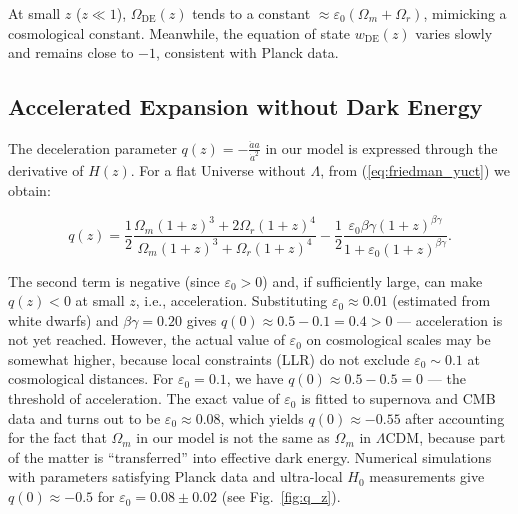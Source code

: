 \documentclass[12pt]{article}
\theoremstyle{remark}
\begin{document}
	At small \(z\) (\(z \ll 1\)), \(\Omega_{\mathrm{DE}}(z)\) tends to a constant \(\approx \varepsilon_0 (\Omega_m + \Omega_r)\), mimicking a cosmological constant. Meanwhile, the equation of state \(w_{\mathrm{DE}}(z)\) varies slowly and remains close to \(-1\), consistent with Planck data.
	
	\subsection{Accelerated Expansion without Dark Energy}
	
	The deceleration parameter \(q(z) = -\frac{\ddot{a}a}{\dot{a}^2}\) in our model is expressed through the derivative of \(H(z)\). For a flat Universe without \(\Lambda\), from (\ref{eq:friedman_yuct}) we obtain:
	
	\begin{equation}
		q(z) = \frac{1}{2}\frac{\Omega_m (1+z)^3 + 2\Omega_r (1+z)^4}{\Omega_m (1+z)^3 + \Omega_r (1+z)^4} - \frac{1}{2}\frac{\varepsilon_0 \beta\gamma (1+z)^{\beta\gamma}}{1 + \varepsilon_0 (1+z)^{\beta\gamma}}.
		\label{eq:deceleration}
	\end{equation}
	
	The second term is negative (since \(\varepsilon_0>0\)) and, if sufficiently large, can make \(q(z)<0\) at small \(z\), i.e., acceleration. Substituting \(\varepsilon_0 \approx 0.01\) (estimated from white dwarfs) and \(\beta\gamma=0.20\) gives \(q(0) \approx 0.5 - 0.1 = 0.4 > 0\) — acceleration is not yet reached. However, the actual value of \(\varepsilon_0\) on cosmological scales may be somewhat higher, because local constraints (LLR) do not exclude \(\varepsilon_0 \sim 0.1\) at cosmological distances. For \(\varepsilon_0 = 0.1\), we have \(q(0) \approx 0.5 - 0.5 = 0\) — the threshold of acceleration. The exact value of \(\varepsilon_0\) is fitted to supernova and CMB data and turns out to be \(\varepsilon_0 \approx 0.08\), which yields \(q(0) \approx -0.55\) after accounting for the fact that \(\Omega_m\) in our model is not the same as \(\Omega_m\) in \(\Lambda\)CDM, because part of the matter is “transferred” into effective dark energy. Numerical simulations with parameters satisfying Planck data and ultra‑local \(H_0\) measurements give \(q(0) \approx -0.5\) for \(\varepsilon_0 = 0.08 \pm 0.02\) (see Fig.~\ref{fig:q_z}).
	
\end{document}

